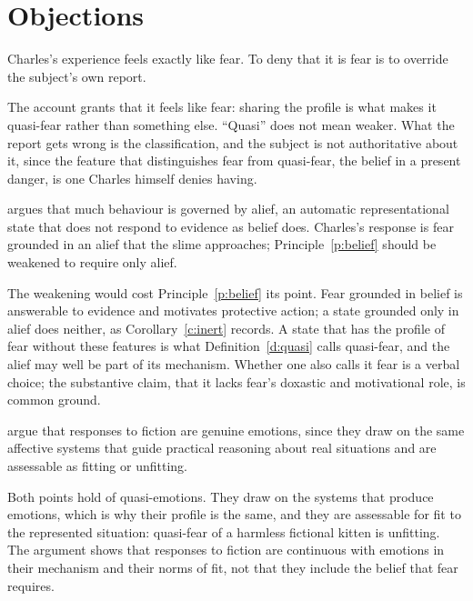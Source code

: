 \documentclass{situationist-preprint}
\begin{document}
\section{Objections}

\begin{objection}[Phenomenology]
Charles's experience feels exactly like fear. To deny that it is fear is to override the subject's own report.
\end{objection}

\begin{reply}
The account grants that it feels like fear: sharing the profile is what makes it quasi-fear rather than something else. \enquote{Quasi} does not mean weaker. What the report gets wrong is the classification, and the subject is not authoritative about it, since the feature that distinguishes fear from quasi-fear, the belief in a present danger, is one Charles himself denies having.
\end{reply}

\begin{objection}[Alief]
\citet{Gendler2008} argues that much behaviour is governed by alief, an automatic representational state that does not respond to evidence as belief does. Charles's response is fear grounded in an alief that the slime approaches; Principle~\ref{p:belief} should be weakened to require only alief.
\end{objection}

\begin{reply}
The weakening would cost Principle~\ref{p:belief} its point. Fear grounded in belief is answerable to evidence and motivates protective action; a state grounded only in alief does neither, as Corollary~\ref{c:inert} records. A state that has the profile of fear without these features is what Definition~\ref{d:quasi} calls quasi-fear, and the alief may well be part of its mechanism. Whether one also calls it fear is a verbal choice; the substantive claim, that it lacks fear's doxastic and motivational role, is common ground.
\end{reply}

\begin{objection}
\citet{GendlerKovakovich2006} argue that responses to fiction are genuine emotions, since they draw on the same affective systems that guide practical reasoning about real situations and are assessable as fitting or unfitting.
\end{objection}

\begin{reply}
Both points hold of quasi-emotions. They draw on the systems that produce emotions, which is why their profile is the same, and they are assessable for fit to the represented situation: quasi-fear of a harmless fictional kitten is unfitting. The argument shows that responses to fiction are continuous with emotions in their mechanism and their norms of fit, not that they include the belief that fear requires.
\end{reply}
\end{document}
